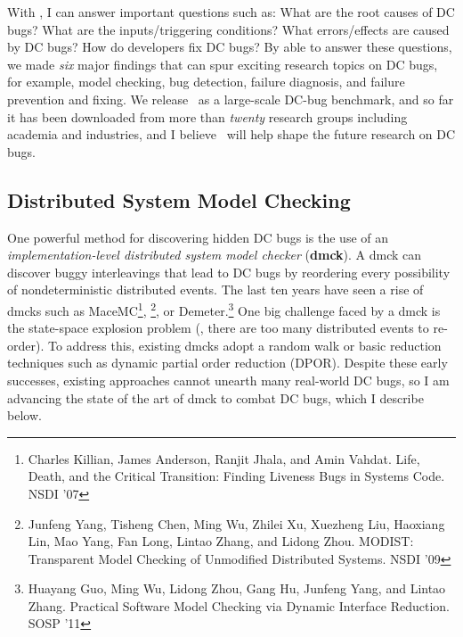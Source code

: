 \documentclass[10pt]{article}
\begin{document}

With \taxdc, I can answer important questions such as: 
%
What are the root causes of DC bugs?
%
What are the inputs/triggering conditions? 
%
What errors/effects are caused by DC bugs?
%
How do developers fix DC bugs? 
%
By able to answer these questions, we made \textit{six} major findings that can
spur exciting research topics on DC bugs, for example, model checking, bug
detection, failure diagnosis, and failure prevention and fixing.
%
We release \taxdc\ as a large-scale DC-bug benchmark, and so far it has been
downloaded from more than \textit{twenty} research groups including academia and
industries, and I believe \taxdc\ will help shape the future research on DC bugs.



\subsection{Distributed System Model Checking}

One powerful method for discovering hidden DC bugs is the use of an
\textit{implementation-level distributed system model checker} (\textbf{dmck}).
A dmck can discover buggy interleavings that lead to DC bugs by reordering
every possibility of nondeterministic distributed events. The last ten years
have seen a rise of dmcks such as 
%
MaceMC\footnote{Charles Killian, James Anderson, Ranjit Jhala,
and Amin Vahdat. Life, Death, and the Critical Transition: Finding Liveness Bugs
in Systems Code. NSDI '07}, 
%
\modist\footnote{Junfeng Yang, Tisheng Chen, Ming
Wu, Zhilei Xu, Xuezheng Liu, Haoxiang Lin, Mao Yang, Fan Long, Lintao Zhang, and
Lidong Zhou. MODIST: Transparent Model Checking of Unmodified Distributed
Systems. NSDI '09}, or Demeter.\footnote{Huayang Guo, Ming Wu, Lidong Zhou, Gang
Hu, Junfeng Yang, and Lintao Zhang. Practical Software Model Checking via
Dynamic Interface Reduction. SOSP '11} One big challenge faced by a dmck is the
state-space explosion problem (\ie, there are too many distributed events to
re-order). To address this, existing dmcks adopt a random walk or basic
reduction techniques such as dynamic partial order reduction (DPOR). Despite
these early successes, existing approaches cannot unearth many real-world DC
bugs, so I am advancing the state of the art of dmck to combat DC bugs, which I
describe below.
\end{document}
